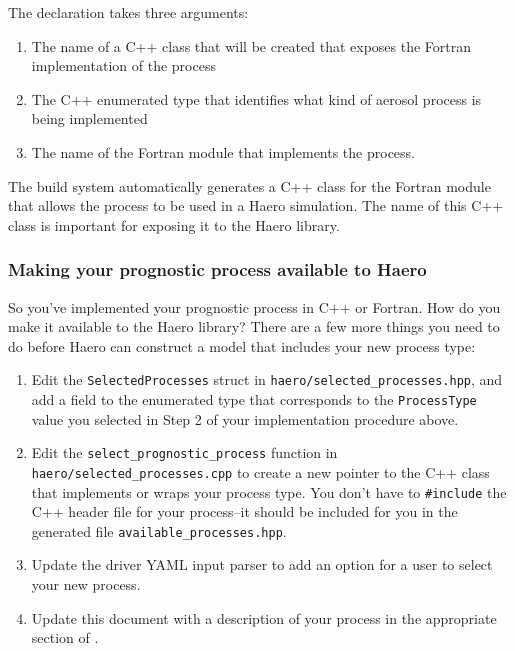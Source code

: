 The declaration takes three arguments:

\begin{enumerate}
  \item The name of a C++ class that will be created that exposes the Fortran
        implementation of the process
  \item The C++ enumerated type that identifies what kind of aerosol process
        is being implemented
  \item The name of the Fortran module that implements the process.
\end{enumerate}

The build system automatically generates a C++ class for the Fortran module that
allows the process to be used in a Haero simulation. The name of this C++ class
is important for exposing it to the Haero library.

\subsubsection{Making your prognostic process available to Haero}

So you've implemented your prognostic process in C++ or Fortran. How do you
make it available to the Haero library? There are a few more things you need to
do before Haero can construct a model that includes your new process type:

\begin{enumerate}
  \item Edit the \texttt{SelectedProcesses} struct in
        \texttt{haero/selected\_processes.hpp}, and add a field to the enumerated
        type that corresponds to the \texttt{ProcessType} value you selected in
        Step 2 of your implementation procedure above.
  \item Edit the \texttt{select\_prognostic\_process} function in
        \texttt{haero/selected\_processes.cpp} to create a new pointer to the C++
        class that implements or wraps your process type. You don't have to
        \texttt{#include} the C++ header file for your process--it should be
        included for you in the generated file \texttt{available\_processes.hpp}.
  \item Update the driver YAML input parser to add an option for a user
        to select your new process.
  \item Update this document with a description of your process in the
        appropriate section of .
\end{enumerate}

